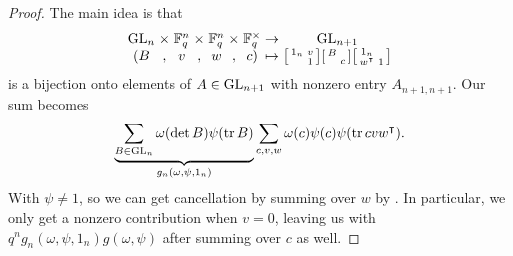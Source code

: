 \begin{proof}
    The main idea is that
    \[\arraycolsep=1.4pt\begin{array}{ccccccccc}
        \GL_n &\times& \FF_q^n &\times& \FF_q^n &\times& \FF_q^\times &\to& \GL_{n+1} \\
        (B &,& v &,& w &,& c) &\mapsto& \begin{bsmallmatrix}
            1_n & v \\
            & 1
        \end{bsmallmatrix}\begin{bsmallmatrix}
            B \\ & c
        \end{bsmallmatrix}\begin{bsmallmatrix}
            1_n \\
            w^\intercal & 1
        \end{bsmallmatrix}
    \end{array}\]
    is a bijection onto elements of $A\in\mathrm{GL}_{n+1}$ with nonzero entry $A_{n+1,n+1}$.
    Our sum becomes
    \[\underbrace{\sum_{B\in\mathrm{GL}_n}\omega(\det B)\psi(\operatorname{tr} B)}_{g_n(\omega,\psi,1_n)}\sum_{c,v,w}\omega(c)\psi(c)\psi(\operatorname{tr} cvw^\intercal).\]
    With $\psi\ne1$, so we can get cancellation by summing over $w$
    by . In particular, we only get a nonzero contribution when $v=0$, leaving us with $q^ng_n(\omega,\psi,1_n)g(\omega,\psi)$
    after summing over $c$ as well.
\end{proof}

